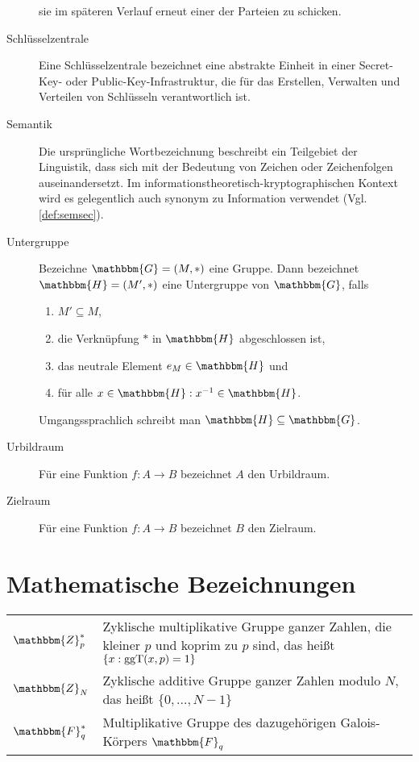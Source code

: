 \begin{description}
	sie im späteren Verlauf erneut einer der Parteien zu schicken.
	\item[Schlüsselzentrale] Eine Schlüsselzentrale bezeichnet eine abstrakte Einheit in einer Secret-Key- oder Public-Key-Infrastruktur, die für das
	Erstellen, Verwalten und Verteilen von Schlüsseln verantwortlich ist.
	\item[Semantik] Die ursprüngliche Wortbezeichnung beschreibt ein Teilgebiet der Linguistik, dass sich mit der Bedeutung von Zeichen oder Zeichenfolgen
	auseinandersetzt. Im informationstheoretisch-kryptographischen Kontext wird es gelegentlich auch synonym zu Information verwendet (Vgl. 
	\ref{def:semsec}).
	\item[Untergruppe] Bezeichne $\mathbbm{G} = (M, \ast)$ eine Gruppe. Dann bezeichnet $\mathbbm{H} = (M', \ast)$ eine Untergruppe von $\mathbbm{G}$,
	falls
	\begin{enumerate}
		\item $M' \subseteq M$,
		\item die Verknüpfung $\ast$ in $\mathbbm{H}$ abgeschlossen ist,
		\item das neutrale Element $e_M \in \mathbbm{H}$ und
		\item für alle $x \in \mathbbm{H} : x^{-1} \in \mathbbm{H}$.
	\end{enumerate}
	Umgangssprachlich schreibt man $\mathbbm{H} \subseteq \mathbbm{G}$.
	\item[Urbildraum] Für eine Funktion $f\colon A \rightarrow B$ bezeichnet $A$ den Urbildraum.
	\item[Zielraum] Für eine Funktion $f\colon A \rightarrow B$ bezeichnet $B$ den Zielraum.
\end{description}

\renewcommand{\arraystretch}{1.5}
\section{Mathematische Bezeichnungen}
\begin{tabularx}{\textwidth}{ p{} | X }
	$\mathbbm{Z}^{\ast}_p$ & Zyklische multiplikative Gruppe ganzer Zahlen, die kleiner $p$ und koprim zu $p$ sind, das heißt $\{x : \operatorname{ggT}(x, p) = 1\}$\\
	$\mathbbm{Z}_N$ & Zyklische additive Gruppe ganzer Zahlen modulo $N$, das heißt ${\{0, \dots, N-1\}}$\\
	$\mathbbm{F}^{\ast}_q$ & Multiplikative Gruppe des dazugehörigen Galois-Körpers $\mathbbm{F}_q$
\end{tabularx}

